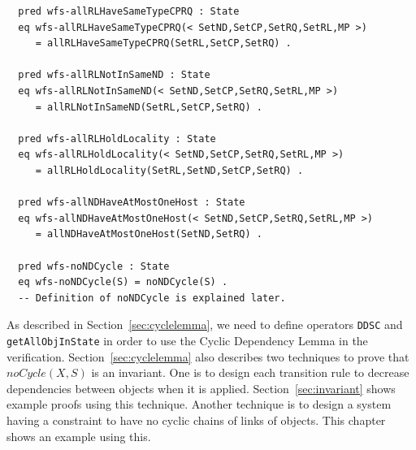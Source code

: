 \documentclass[12pt]{report}
\begin{document}
\begin{verbatim}
  pred wfs-allRLHaveSameTypeCPRQ : State
  eq wfs-allRLHaveSameTypeCPRQ(< SetND,SetCP,SetRQ,SetRL,MP >)
     = allRLHaveSameTypeCPRQ(SetRL,SetCP,SetRQ) .

  pred wfs-allRLNotInSameND : State
  eq wfs-allRLNotInSameND(< SetND,SetCP,SetRQ,SetRL,MP >)
     = allRLNotInSameND(SetRL,SetCP,SetRQ) .

  pred wfs-allRLHoldLocality : State
  eq wfs-allRLHoldLocality(< SetND,SetCP,SetRQ,SetRL,MP >)
     = allRLHoldLocality(SetRL,SetND,SetCP,SetRQ) .

  pred wfs-allNDHaveAtMostOneHost : State
  eq wfs-allNDHaveAtMostOneHost(< SetND,SetCP,SetRQ,SetRL,MP >)
     = allNDHaveAtMostOneHost(SetND,SetRQ) .

  pred wfs-noNDCycle : State
  eq wfs-noNDCycle(S) = noNDCycle(S) .
  -- Definition of noNDCycle is explained later.
\end{verbatim}
\normalsize

As described in Section~\ref{sec:cyclelemma}, we need to define operators
{\tt DDSC} and {\tt getAllObjInState} in order to use the Cyclic Dependency
Lemma in the verification. Section~\ref{sec:cyclelemma} also describes
two techniques to prove that $noCycle(X,S)$ is an invariant. One is
to design each transition rule to decrease dependencies between objects
when it is applied. Section~\ref{sec:invariant} shows example proofs
using this technique. Another technique is to design a system having
a constraint to have no cyclic chains of links of objects. This chapter
shows an example using this.
\end{document}
